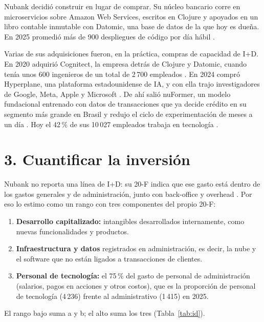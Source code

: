 \documentclass[11pt,letterpaper]{article}
\begin{document}
Nubank decidió construir en lugar de comprar. Su núcleo bancario corre en
microservicios sobre Amazon Web Services, escritos en Clojure y apoyados en
un libro contable inmutable con Datomic, una base de datos de la que hoy es
dueña. En 2025 promedió más de 900 despliegues de código por día hábil
\parencite{nu2026}.

Varias de sus adquisiciones fueron, en la práctica, compras de capacidad de
I+D. En 2020 adquirió Cognitect, la empresa detrás de Clojure y Datomic,
cuando tenía unos 600 ingenieros de un total de 2\,700 empleados
\parencite{nubank2020}. En 2024 compró Hyperplane, una plataforma
estadounidense de IA, y con ella trajo investigadores de Google, Meta, Apple
y Microsoft \parencite{nu2026ia}. De ahí salió nuFormer, un modelo fundacional entrenado con datos
de transacciones \parencite{braithwaite2025} que ya decide crédito en su
segmento más grande en Brasil y redujo el ciclo de experimentación de meses a
un día \parencite{nu2026ia}. Hoy el 42\,\% de sus 10\,027 empleados trabaja
en tecnología \parencite{nu2026}.

\section*{3. Cuantificar la inversión}

Nubank no reporta una línea de I+D: su 20-F indica que ese gasto está dentro
de los gastos generales y de administración, junto con back-office y
overhead \parencite{nu2026}. Por eso lo estimo como un rango con tres
componentes del propio 20-F:

\begin{enumerate}[label=\alph*), leftmargin=1.6em, itemsep=0.25em]
  \item \textbf{Desarrollo capitalizado:} intangibles desarrollados
    internamente, como nuevas funcionalidades y productos.
  \item \textbf{Infraestructura y datos} registrados en administración, es
    decir, la nube y el software que no están ligados a transacciones de
    clientes.
  \item \textbf{Personal de tecnología:} el 75\,\% del gasto de personal de
    administración (salarios, pagos en acciones y otros costos), que es la
    proporción de personal de tecnología (4\,236) frente al administrativo
    (1\,415) en 2025.
\end{enumerate}

El rango bajo suma a y b; el alto suma los tres (Tabla~\ref{tab:id}).
\end{document}
